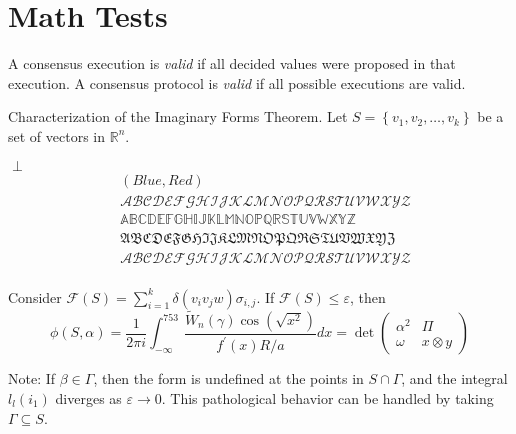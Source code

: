 \section{Math Tests}

\begin{definition}[name={Heterogeneous Validity \protect\citep{anoma-taiga}}, label={def:het-valid}]
    A consensus execution
    is \emph{valid} if all  decided values were proposed in that execution.
    A consensus protocol is \emph{valid} if all possible executions are valid.
\end{definition}

Characterization of the Imaginary Forms
Theorem.
Let $S=\left\{v_1, v_2, \ldots, v_k\right\}$ be a set of vectors in $\mathbb{R}^n$.


\begin{center}
    $\perp$
    \begin{equation}
        \begin{split}
        &(\mathit{Blue}, \mathit{Red})\\
        &\mathcal{ABC DEF GHI JKL MNO PQR ST UVW XYZ}\\
        &\mathbb{ABC DEF GHI JKL MNO PQR ST UVW XYZ}\\
        &\mathfrak{ABC DEF GHI JKL MNO PQR ST UVW XYZ}\\
        &\mathscr{ABC DEF GHI JKL MNO PQR ST UVW XYZ}\\
        \end{split}
    \end{equation}
\end{center}
Consider $\mathcal{F}(S)=\sum_{i=1}^k \delta\left(v_i v_j w\right) \sigma_{i, j}$.
If $\mathcal{F}(S) \leq \varepsilon$, then
$$
\phi(S, \alpha)=\frac{1}{2 \pi i} \int_{-\infty}^{753} \frac{\tilde{W}_n(\gamma) \cos \left(\sqrt{x^2}\right)}{f^{\prime}(x) R / a} d x=\operatorname{det}\left(\begin{array}{cc}
\alpha^2 & \Pi \\
\omega & x \otimes y
\end{array}\right)
$$


Note: If $\beta \in \Gamma$, then the form is undefined at the points in $S \cap \Gamma$, and the integral $l_l\left(i_1\right)$ diverges as $\varepsilon \rightarrow 0$. This pathological behavior can be handled by taking $\Gamma \subseteq S$.

